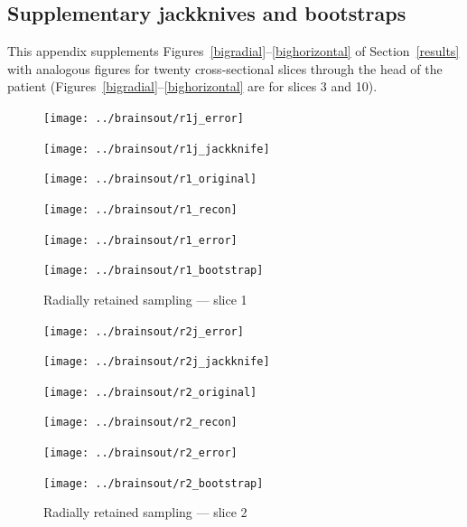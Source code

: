 \documentclass[article]{jdssv}
\begin{document}
\newpage

\begin{appendix}

\section{Supplementary jackknives and bootstraps}
\label{suppfigs}

This appendix supplements Figures~\ref{bigradial}--\ref{bighorizontal}
of Section~\ref{results} with analogous figures
for twenty cross-sectional slices through the head of the patient
(Figures~\ref{bigradial}--\ref{bighorizontal} are for slices 3 and 10).


\begin{figure}
\begin{centering}

\parbox{\imsize}{\texttt{[image: ../brainsout/r1j\_error]}}
\parbox{\imsize}{\texttt{[image: ../brainsout/r1j\_jackknife]}}

\vspace{\vertsep}

\parbox{\imsize}{\texttt{[image: ../brainsout/r1\_original]}}
\parbox{\imsize}{\texttt{[image: ../brainsout/r1\_recon]}}

\vspace{\vertsep}

\parbox{\imsize}{\texttt{[image: ../brainsout/r1\_error]}}
\parbox{\imsize}{\texttt{[image: ../brainsout/r1\_bootstrap]}}

\end{centering}
\caption{Radially retained sampling --- slice 1}
\end{figure}


\begin{figure}
\begin{centering}

\parbox{\imsize}{\texttt{[image: ../brainsout/r2j\_error]}}
\parbox{\imsize}{\texttt{[image: ../brainsout/r2j\_jackknife]}}

\vspace{\vertsep}

\parbox{\imsize}{\texttt{[image: ../brainsout/r2\_original]}}
\parbox{\imsize}{\texttt{[image: ../brainsout/r2\_recon]}}

\vspace{\vertsep}

\parbox{\imsize}{\texttt{[image: ../brainsout/r2\_error]}}
\parbox{\imsize}{\texttt{[image: ../brainsout/r2\_bootstrap]}}

\end{centering}
\caption{Radially retained sampling --- slice 2}
\end{figure}



\end{appendix}
\end{document}
